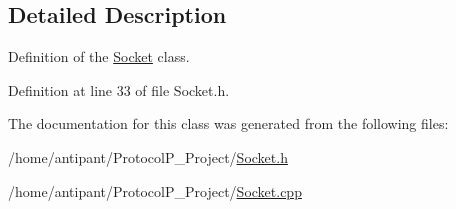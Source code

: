 \subsection{Detailed Description}
Definition of the \hyperlink{classSocket}{Socket} class. 

Definition at line 33 of file Socket.\-h.



The documentation for this class was generated from the following files\-:\begin{DoxyCompactItemize}
\item 
/home/antipant/\-Protocol\-P\-\_\-\-Project/\hyperlink{Socket_8h}{Socket.\-h}\item 
/home/antipant/\-Protocol\-P\-\_\-\-Project/\hyperlink{Socket_8cpp}{Socket.\-cpp}\end{DoxyCompactItemize}
